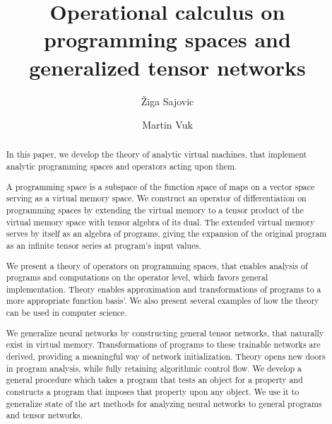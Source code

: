 \documentclass[smallcondensed]{svjour3}
\begin{document}
\title{Operational calculus on programming spaces and generalized tensor networks}
\author{Žiga Sajovic \and Martin Vuk}
\maketitle
\begin{abstract}
In this paper, we develop the theory of analytic virtual machines, that
implement analytic programming spaces and operators acting upon them.

A programming space is a subspace of the function space of maps on a vector
space serving as a virtual memory space. We construct an operator of
differentiation on programming spaces by extending the virtual memory to a
tensor product of the virtual memory space with tensor algebra 
of its dual. The extended virtual memory serves by itself as an algebra of 
programs, giving the expansion of the original program as an infinite tensor
series at program's input values.  

We present a theory of operators on programming spaces, that enables analysis of programs
and computations on the operator level, which favors general implementation. Theory enables
approximation and transformations of programs to a more appropriate function basis'. We
also present several examples of how the theory can be used in computer science.

We generalize neural networks by constructing general tensor networks, that naturally exist in virtual memory. Transformations of programs to these trainable networks are derived, providing a meaningful way of network initialization.
Theory opens new doors in program analysis, while fully retaining algorithmic control flow. We develop a general
procedure which takes a program that tests an object for a property and
constructs a program that imposes that property upon any object. 
We use it to generalize state of the art methods for analyzing neural networks to general programs and tensor networks.

\end{abstract}
\end{document}
